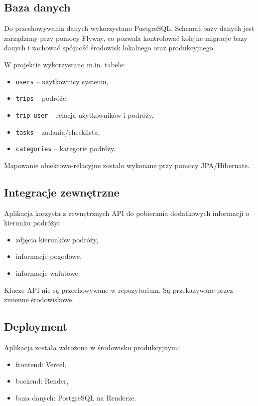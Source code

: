 \documentclass[12pt,a4paper]{article}
\begin{document}
\subsection{Baza danych}

Do przechowywania danych wykorzystano PostgreSQL. Schemat bazy danych jest zarządzany przy pomocy Flyway, co pozwala kontrolować kolejne migracje bazy danych i zachować spójność środowisk lokalnego oraz produkcyjnego.

W projekcie wykorzystano m.in. tabele:
\begin{itemize}
\item \texttt{users} -- użytkownicy systemu,
\item \texttt{trips} -- podróże,
\item \texttt{trip_user} -- relacja użytkowników i podróży,
\item \texttt{tasks} -- zadania/checklista,
\item \texttt{categories} -- kategorie podróży.
\end{itemize}

Mapowanie obiektowo-relacyjne zostało wykonane przy pomocy JPA/Hibernate.

\subsection{Integracje zewnętrzne}

Aplikacja korzysta z zewnętrznych API do pobierania dodatkowych informacji o kierunku podróży:
\begin{itemize}
\item zdjęcia kierunków podróży,
\item informacje pogodowe,
\item informacje walutowe.
\end{itemize}

Klucze API nie są przechowywane w repozytorium. Są przekazywane przez zmienne środowiskowe.

\subsection{Deployment}

Aplikacja została wdrożona w środowisku produkcyjnym:
\begin{itemize}
\item frontend: Vercel,
\item backend: Render,
\item baza danych: PostgreSQL na Renderze.
\end{itemize}
\end{document}
